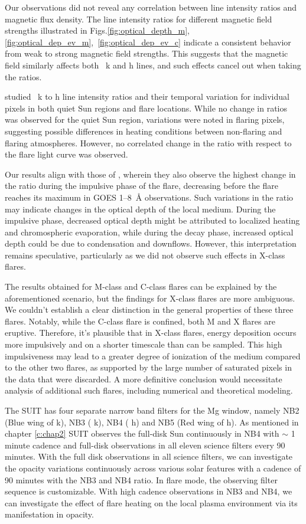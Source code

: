 Our observations did not reveal any correlation between line intensity ratios and magnetic flux density. The line intensity ratios for different magnetic field strengths illustrated in Figs.\ref{fig:optical_depth_m},\ref{fig:optical_dep_ev_m},~\ref{fig:optical_dep_ev_c} indicate a consistent behavior from weak to strong magnetic field strengths. This suggests that the magnetic field similarly affects both  ~k and h lines, and such effects cancel out when taking the ratios.

\cite{kerr15} studied  ~k to h line intensity ratios and their temporal variation for individual pixels in both quiet Sun regions and flare locations. While no change in ratios was observed for the quiet Sun region, variations were noted in flaring pixels, suggesting possible differences in heating conditions between non-flaring and flaring atmospheres. However, no correlated change in the ratio with respect to the flare light curve was observed.

Our results align with those of \cite{kerr15}, wherein they also observe the highest change in the ratio during the impulsive phase of the flare, decreasing before the flare reaches its maximum in GOES 1{--}8~{\AA} observations. Such variations in the ratio may indicate changes in the optical depth of the local medium. During the impulsive phase, decreased optical depth might be attributed to localized heating and chromospheric evaporation, while during the decay phase, increased optical depth could be due to condensation and downflows. However, this interpretation remains speculative, particularly as we did not observe such effects in X-class flares.

The results obtained for M-class and C-class flares can be explained by the aforementioned scenario, but the findings for X-class flares are more ambiguous. We couldn't establish a clear distinction in the general properties of these three flares. Notably, while the C-class flare is confined, both M and X flares are eruptive. Therefore, it's plausible that in X-class flares, energy deposition occurs more impulsively and on a shorter timescale than can be sampled. This high impulsiveness may lead to a greater degree of ionization of the medium compared to the other two flares, as supported by the large number of saturated pixels in the data that were discarded. A more definitive conclusion would necessitate analysis of additional such flares, including numerical and theoretical modeling.

The SUIT has four separate narrow band filters for the Mg window, namely NB2 (Blue wing of   k), NB3 (  k), NB4 (  h) and NB5 (Red wing of   h). As mentioned in chapter \ref{c:chap2} SUIT observes the full-disk Sun continuously in NB4 with $\sim$ 1 minute cadence and full-disk observations in all eleven science filters every 90 minutes. With the full disk observations in all science filters, we can investigate the opacity variations continuously across various solar features with a cadence of 90 minutes with the NB3 and NB4 ratio. In flare mode, the observing filter sequence is customizable. With high cadence observations in NB3 and NB4, we can investigate the effect of flare heating on the local plasma environment via its manifestation in opacity.